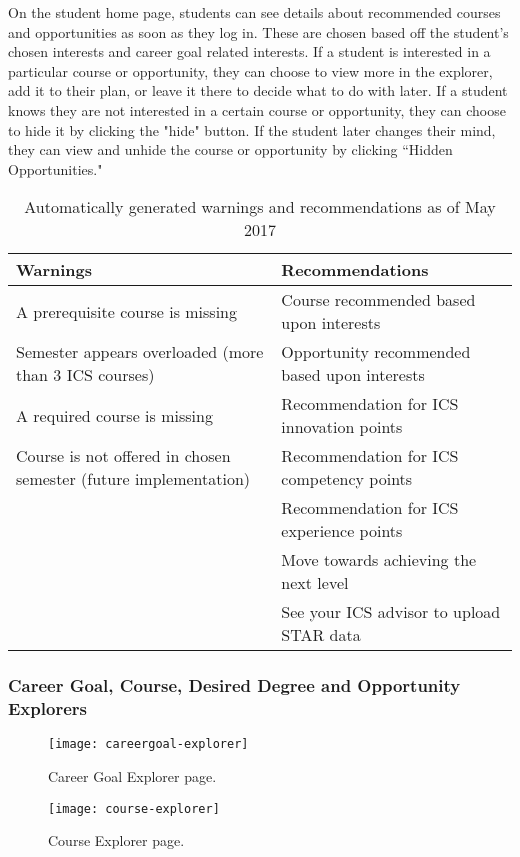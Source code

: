 On the student home page, students can see details about recommended courses and opportunities as soon as they log in. These are chosen based off the student's chosen interests and career goal related interests. If a student is interested in a particular course or opportunity, they can choose to view more in the explorer, add it to their plan, or leave it there to decide what to do with later. If a student knows they are not interested in a certain course or opportunity, they can choose to hide it by clicking the "hide" button. If the student later changes their mind, they can view and unhide the course or opportunity by clicking ``Hidden Opportunities."

\begin{table}[h!]
\centering
\begin{tabular}{  |p{8cm}|p{8cm}| } 
  \hline
 \textbf{Warnings} & \textbf{Recommendations} \\ 
  \hline
A prerequisite course is missing & Course recommended based upon interests\\
\hline
Semester appears overloaded (more than 3 ICS courses) & Opportunity recommended based upon interests\\
\hline
A required course is missing & Recommendation for ICS innovation points \\
\hline
Course is not offered in chosen semester (future implementation) & Recommendation for ICS competency points \\
\hline
& Recommendation for ICS experience points\\
\hline
& Move towards achieving the next level \\
\hline
& See your ICS advisor to upload STAR data\\
 \hline
\end{tabular}
\caption{Automatically generated warnings and recommendations as of May 2017}
\label{table:4}
\end{table}

\subsubsection{Career Goal, Course, Desired Degree and Opportunity Explorers}
\begin{figure}[h]
\centering
\texttt{[image: careergoal-explorer]}
\caption{Career Goal Explorer page.}
\end{figure}

\begin{figure}[h]
\centering
\texttt{[image: course-explorer]}
\caption{Course Explorer page.}
\end{figure}

